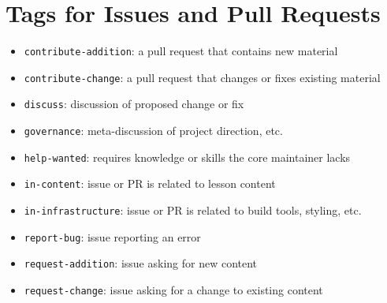 \documentclass[krantzl]{krantz}
\begin{document}
\section{Tags for Issues and Pull Requests}
\begin{itemize}
\item \texttt{contribute-addition}: a pull request that contains new material

\item \texttt{contribute-change}: a pull request that changes or fixes existing material

\item \texttt{discuss}: discussion of proposed change or fix

\item \texttt{governance}: meta-discussion of project direction, etc.

\item \texttt{help-wanted}: requires knowledge or skills the core maintainer lacks

\item \texttt{in-content}: issue or PR is related to lesson content

\item \texttt{in-infrastructure}: issue or PR is related to build tools, styling, etc.

\item \texttt{report-bug}: issue reporting an error

\item \texttt{request-addition}: issue asking for new content

\item \texttt{request-change}: issue asking for a change to existing content

\end{itemize}
\end{document}
